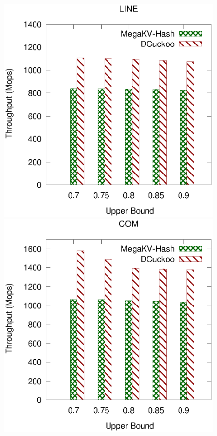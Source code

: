\begin{figure}[htp]
\begin{minipage}{0.19\linewidth}
		\centerline{\dsreddit}
	\end{minipage}
	\begin{minipage}{0.19\linewidth}\centering
		\includegraphics[width=\linewidth]{pic/dynamic/upper/dynamic_tpch.eps}
		\centerline{\dstpch}
	\end{minipage}
	\begin{minipage}{0.19\linewidth}\centering
		\includegraphics[width=\linewidth]{pic/dynamic/upper/dynamic_ali.eps}

\end{minipage}
\end{figure}

